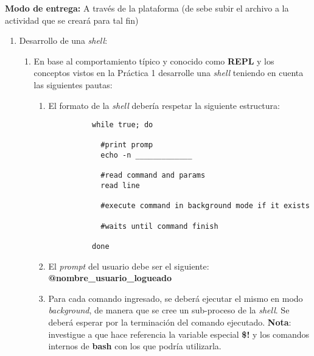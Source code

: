 \textbf{Modo de entrega:} A través de la plataforma (de sebe subir el archivo a la actividad que se creará para tal fin)

\renewcommand{\labelenumiii}{\roman{enumiii})}

\begin{enumerate}
 \item Desarrollo de una \textit{shell}:
      \begin{enumerate}
	    \item En base al comportamiento típico y conocido como \textbf{REPL} y los conceptos vistos en la Práctica 1 desarrolle una \textit{shell} teniendo en cuenta las siguientes pautas:
	    \begin{enumerate}
	      \item El formato de la \textit{shell} debería respetar la siguiente estructura: 
	      \begin{lstlisting}
		  while true; do
		  
		    #print promp
		    echo -n _____________
		    
		    #read command and params
		    read line
		    
		    #execute command in background mode if it exists
		    
		    #waits until command finish
		    
		  done
	      \end{lstlisting}
	      
	      \item El \textit{prompt} del usuario debe ser el siguiente: \textbf{@nombre\_usuario\_logueado}
	      
	      \item Para cada comando ingresado, se deberá ejecutar el mismo en modo \textit{background}, de manera que se cree un sub-proceso de la \textit{shell}. Se deberá esperar por la terminación del comando ejecutado. \textbf{Nota}: investigue a que hace referencia la variable especial \textbf{\$!} y los comandos internos de \textbf{bash} con los que podría utilizarla. 
	    \end{enumerate}
	    

\end{enumerate}
\end{enumerate}
